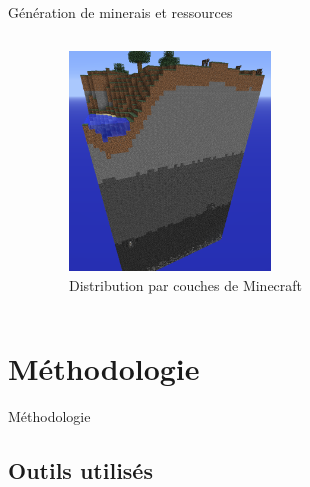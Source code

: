 \documentclass[aspectratio=169]{beamer}
\begin{document}
\begin{frame}{Génération de minerais et ressources}
    \begin{columns}
        \centering
        \begin{column}{0.5\textwidth}
            \centering
            \lipsum[1][1-5]
        \end{column}
        \begin{column}{0.5\textwidth}
            \centering
            \begin{figure}
                \centering
                \captionsetup{format=sanslabel}
                \includegraphics[width=0.5\textwidth]{assets/stratification.png}
                \caption{Distribution par couches de Minecraft}
            \end{figure}
        \end{column}
    \end{columns}
\end{frame}


\section{Méthodologie}

\begin{frame}{Méthodologie}
    \tableofcontents[sections={3}]
\end{frame}

\subsection{Outils utilisés}
\end{document}

